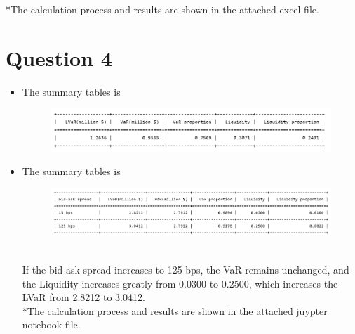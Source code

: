 \documentclass[UTF8]{ctexart}
\begin{document}
*The calculation process and results are shown in the attached excel file.

\section*{Question 4}
\begin{itemize}

	\item The summary tables is \\
	      \begin{figure}[ht]
		      \centering\includegraphics[scale=0.8]{4.1.png}
	      \end{figure}
	\item The summary tables is
	      \begin{figure}[ht]
		      \centering\includegraphics[scale=0.7]{4.2.png}
	      \end{figure}
	      \\
	      If the bid-ask spread increases to 125 bps, the VaR remains unchanged, and the Liquidity increases greatly from 0.0300 to 0.2500, which increases the LVaR from 2.8212 to 3.0412. \\

	      *The calculation process and results are shown in the attached juypter notebook file.

\end{itemize}
\end{document}
